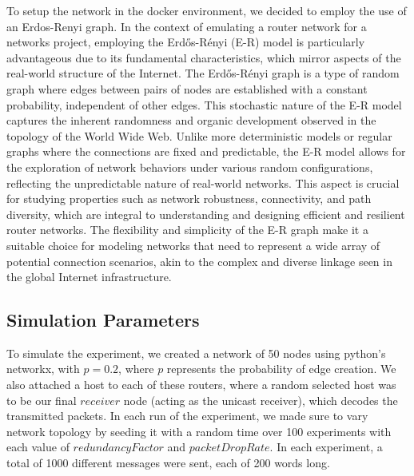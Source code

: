 To setup the network in the docker environment, we decided to employ the use of an
Erdos-Renyi graph.
In the context of emulating a router network for a networks project, employing the Erdős-Rényi (E-R) model is particularly advantageous due to its fundamental characteristics, which mirror aspects of the real-world structure of the Internet\cite{Li2021}. The Erdős-Rényi graph is a type of random graph where edges between pairs of nodes are established with a constant probability, independent of other edges. This stochastic nature of the E-R model captures the inherent randomness and organic development observed in the topology of the World Wide Web. Unlike more deterministic models or regular graphs where the connections are fixed and predictable, the E-R model allows for the exploration of network behaviors under various random configurations, reflecting the unpredictable nature of real-world networks. This aspect is crucial for studying properties such as network robustness, connectivity, and path diversity, which are integral to understanding and designing efficient and resilient router networks. The flexibility and simplicity of the E-R graph make it a suitable choice for modeling networks that need to represent a wide array of potential connection scenarios, akin to the complex and diverse linkage seen in the global Internet infrastructure.

\subsection{Simulation Parameters}

To simulate the experiment, we created a network of 50 nodes using python's networkx, with $p=0.2$, where $p$ represents the probability of edge creation. We also attached a host to each of these routers, where a random selected host was to be our
final $receiver$ node (acting as the unicast receiver), which decodes the transmitted packets. In each run of the experiment, we made sure to vary network topology by seeding it with a random time over 100 experiments with each value of $redundancyFactor$ and $packetDropRate$. In each experiment, a total of 
1000 different messages were sent, each of 200 words long. 





